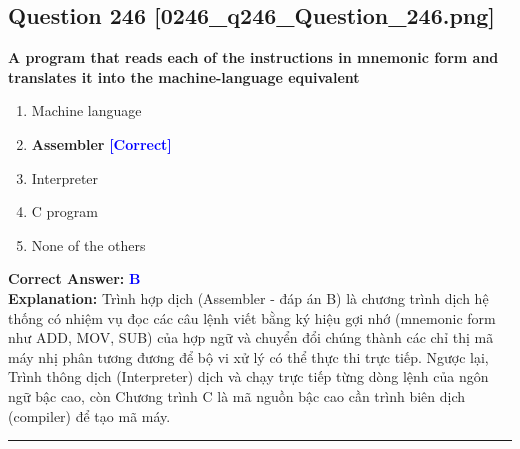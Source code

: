 \documentclass[11pt,a4paper]{article}
\begin{document}
\begin{minipage}{\textwidth}
\subsection*{Question 246 \quad \footnotesize{[0246\_q246\_Question\_246.png]}}
\noindent \textbf{A program that reads each of the instructions in mnemonic form and translates it into the machine-language equivalent}

\begin{enumerate}[label=\Alph*.]
    \item Machine language
    \item \textbf{Assembler} \hfill \textcolor{blue}{\textbf{[Correct]}}
    \item Interpreter
    \item C program
    \item None of the others
\end{enumerate}

\noindent \textbf{Correct Answer:} \textcolor{blue}{\textbf{B}} \\[2pt]
\noindent \textbf{Explanation:} Trình hợp dịch (Assembler - đáp án B) là chương trình dịch hệ thống có nhiệm vụ đọc các câu lệnh viết bằng ký hiệu gợi nhớ (mnemonic form như ADD, MOV, SUB) của hợp ngữ và chuyển đổi chúng thành các chỉ thị mã máy nhị phân tương đương để bộ vi xử lý có thể thực thi trực tiếp. Ngược lại, Trình thông dịch (Interpreter) dịch và chạy trực tiếp từng dòng lệnh của ngôn ngữ bậc cao, còn Chương trình C là mã nguồn bậc cao cần trình biên dịch (compiler) để tạo mã máy.

\par\vspace{0.3cm}
\hrule
\vspace{0.3cm}
\end{minipage}
\end{document}
